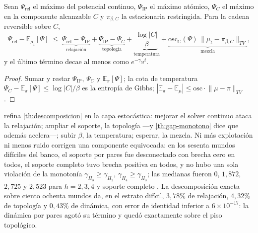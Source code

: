 \begin{proposicion}
\label{pr:cuatro-mecanismos}
Sean $\Psi_{\mathrm{rel}}$ el máximo del potencial continuo,
$\Psi_{\mathrm{IP}}$ el máximo atómico, $\Psi_{C}$ el máximo en la componente
alcanzable $C$ y $\pi_{\beta,C}$ la estacionaria restringida. Para la cadena
reversible sobre $C$,
\begin{equation}
  \label{eq:cuatro-mecanismos}
  \Psi_{\mathrm{rel}}-\mathbb E_{\mu_t}[\Psi]\;\le\;
  \underbrace{\Psi_{\mathrm{rel}}-\Psi_{\mathrm{IP}}}_{\text{relajación}}
  +\underbrace{\Psi_{\mathrm{IP}}-\Psi_{C}}_{\text{topología}}
  +\underbrace{\frac{\log|C|}{\beta}}_{\text{temperatura}}
  +\underbrace{\mathrm{osc}_C(\Psi)\,\lVert\mu_t-\pi_{\beta,C}\rVert_{TV}}_{\text{mezcla}},
\end{equation}
y el último término decae al menos como $e^{-\gamma_Mt}$.
\end{proposicion}

\begin{proof}
Sumar y restar $\Psi_{\mathrm{IP}}$, $\Psi_C$ y $\mathbb E_\pi[\Psi]$; la cota
de temperatura $\Psi_C-\mathbb E_{\pi}[\Psi]\le\log|C|/\beta$ es la entropía
de Gibbs; $|\mathbb E_\pi-\mathbb E_\mu|\le\mathrm{osc}\cdot\lVert\mu-\pi\rVert_{TV}$.
\end{proof}

\begin{observacion}
\label{obs:cuatro-palancas}
 refina \cref{th:descomposicion} en la capa
estocástica: mejorar el solver continuo ataca la relajación; ampliar el
soporte, la topología —y \cref{th:gap-monotono} dice que además acelera—;
subir $\beta$, la temperatura; esperar, la mezcla. Ni más explotación ni menos
ruido corrigen una componente equivocada: en los sesenta mundos difíciles del
banco, el soporte por pares fue desconectado con brecha cero en todos, el
soporte completo tuvo brecha positiva en todos, y no hubo una sola violación
de la monotonía $\gamma_{H_3}\ge\gamma_{H_2}$, $\gamma_{H_4}\ge\gamma_{H_3}$;
las medianas fueron $0$, $1{,}872$, $2{,}725$ y $2{,}523$ para $h=2,3,4$ y
soporte completo \cite{mayorga2026compendio}. La descomposición exacta sobre
ciento ochenta mundos da, en el estrato difícil, $3{,}78\%$ de relajación,
$4{,}32\%$ de topología y $0{,}43\%$ de dinámica, con error de identidad
inferior a $6\times10^{-17}$: la dinámica por pares agotó su término y quedó
exactamente sobre el piso topológico.
\end{observacion}
